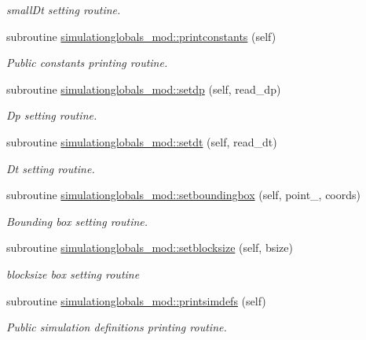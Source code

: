 \begin{DoxyCompactItemize}
\begin{DoxyCompactList}\small\item\em small\+Dt setting routine. \end{DoxyCompactList}\item 
subroutine \mbox{\hyperlink{namespacesimulationglobals__mod_a139cb36f8366e6aec875c7977235fd68}{simulationglobals\+\_\+mod\+::printconstants}} (self)
\begin{DoxyCompactList}\small\item\em Public constants printing routine. \end{DoxyCompactList}\item 
subroutine \mbox{\hyperlink{namespacesimulationglobals__mod_afda1e73e6e0cd075875c70aded99d425}{simulationglobals\+\_\+mod\+::setdp}} (self, read\+\_\+dp)
\begin{DoxyCompactList}\small\item\em Dp setting routine. \end{DoxyCompactList}\item 
subroutine \mbox{\hyperlink{namespacesimulationglobals__mod_a0eced3f4367d08f3d0cb6ef2044bdc56}{simulationglobals\+\_\+mod\+::setdt}} (self, read\+\_\+dt)
\begin{DoxyCompactList}\small\item\em Dt setting routine. \end{DoxyCompactList}\item 
subroutine \mbox{\hyperlink{namespacesimulationglobals__mod_abf5afcc12763caab3a5fc394255ced44}{simulationglobals\+\_\+mod\+::setboundingbox}} (self, point\+\_\+, coords)
\begin{DoxyCompactList}\small\item\em Bounding box setting routine. \end{DoxyCompactList}\item 
subroutine \mbox{\hyperlink{namespacesimulationglobals__mod_af0bc0b00ee3aa2ba9e47dc50daa72799}{simulationglobals\+\_\+mod\+::setblocksize}} (self, bsize)
\begin{DoxyCompactList}\small\item\em blocksize box setting routine \end{DoxyCompactList}\item 
subroutine \mbox{\hyperlink{namespacesimulationglobals__mod_a54196bff569fc838730ba39a722319ff}{simulationglobals\+\_\+mod\+::printsimdefs}} (self)
\begin{DoxyCompactList}\small\item\em Public simulation definitions printing routine. \end{DoxyCompactList}\item 

\end{DoxyCompactItemize}
